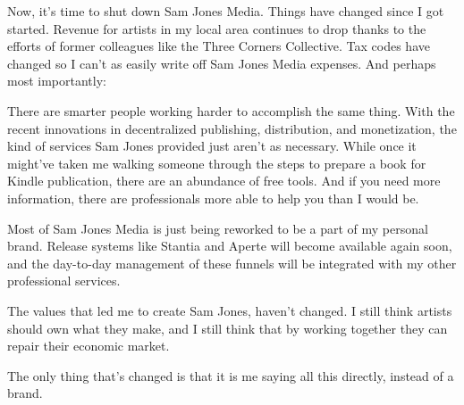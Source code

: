 \documentclass[11pt]{article}
\begin{document}
\begin{itemize}
Now, it’s time to shut down Sam Jones Media. Things have changed since I got started. Revenue for artists in my local area continues to drop thanks to the efforts of former colleagues like the Three Corners Collective. Tax codes have changed so I can’t as easily write off Sam Jones Media expenses. And perhaps most importantly:

There are smarter people working harder to accomplish the same thing. With the recent innovations in decentralized publishing, distribution, and monetization, the kind of services Sam Jones provided just aren’t as necessary. While once it might’ve taken me walking someone through the steps to prepare a book for Kindle publication, there are an abundance of free tools. And if you need more information, there are professionals more able to help you than I would be.

Most of Sam Jones Media is just being reworked to be a part of my personal brand. Release systems like Stantia and Aperte will become available again soon, and the day-to-day management of these funnels will be integrated with my other professional services.

The values that led me to create Sam Jones, haven’t changed. I still think artists should own what they make, and I still think that by working together they can repair their economic market.

The only thing that’s changed is that it is me saying all this directly, instead of a brand.
\end{itemize}
\stopcontents[level-4]
\end{document}
